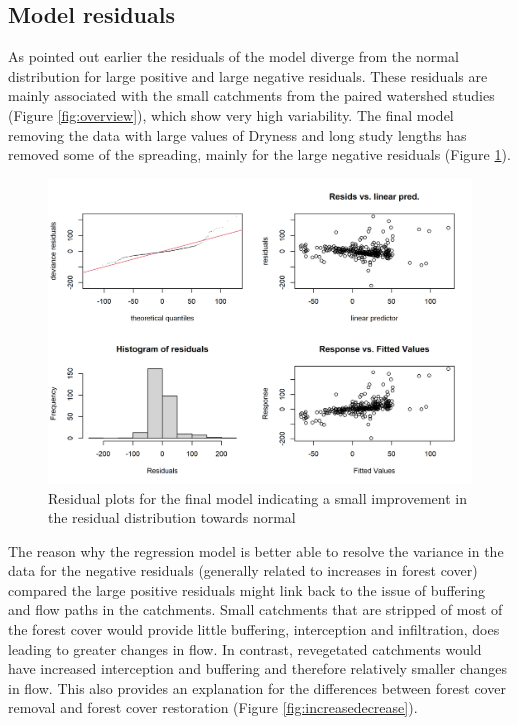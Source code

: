 \documentclass[]{elsarticle} %
\begin{document}
\hypertarget{model-residuals}{%
\subsection{Model residuals}\label{model-residuals}}

As pointed out earlier the residuals of the model diverge from the normal distribution for large positive and large negative residuals. These residuals are mainly associated with the small catchments from the paired watershed studies (Figure \ref{fig:overview}), which show very high variability. The final model removing the data with large values of Dryness and long study lengths has removed some of the spreading, mainly for the large negative residuals (Figure \ref{fig:gamcheck7}).

\begin{figure}
\includegraphics[width=0.9\linewidth]{residual_plot_model7} \caption{Residual plots for the final model indicating a small improvement in the residual distribution towards normal}\label{fig:gamcheck7}
\end{figure}

The reason why the regression model is better able to resolve the variance in the data for the negative residuals (generally related to increases in forest cover) compared the large positive residuals might link back to the issue of buffering and flow paths in the catchments. Small catchments that are stripped of most of the forest cover would provide little buffering, interception and infiltration, does leading to greater changes in flow. In contrast, revegetated catchments would have increased interception and buffering and therefore relatively smaller changes in flow. This also provides an explanation for the differences between forest cover removal and forest cover restoration (Figure \ref{fig:increasedecrease}).
\end{document}
